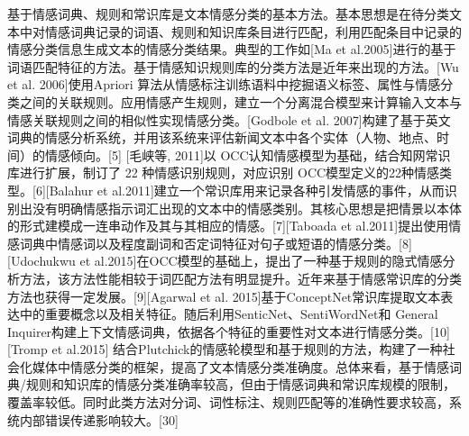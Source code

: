 基于情感词典、规则和常识库是文本情感分类的基本方法。基本思想是在待分类文本中对情感词典记录的词语、规则和知识库条目进行匹配，利用匹配条目中记录的情感分类信息生成文本的情感分类结果。典型的工作如[Ma et al.2005]进行的基于词语匹配特征的方法。基于情感知识规则库的分类方法是近年来出现的方法。[Wu et al. 2006]使用Apriori 算法从情感标注训练语料中挖掘语义标签、属性与情感分类之间的关联规则。应用情感产生规则，建立一个分离混合模型来计算输入文本与情感关联规则之间的相似性实现情感分类。[Godbole et al. 2007]构建了基于英文词典的情感分析系统，并用该系统来评估新闻文本中各个实体（人物、地点、时间）的情感倾向。[5] [毛峡等, 2011]以 OCC认知情感模型为基础，结合知网常识库进行扩展，制订了 22 种情感识别规则，对应识别 OCC模型定义的22种情感类型。[6][Balahur et al.2011]建立一个常识库用来记录各种引发情感的事件，从而识别出没有明确情感指示词汇出现的文本中的情感类别。其核心思想是把情景以本体的形式建模成一连串动作及其与其相应的情感。[7][Taboada et al.2011]提出使用情感词典中情感词以及程度副词和否定词特征对句子或短语的情感分类。[8][Udochukwu et al.2015]在OCC模型的基础上，提出了一种基于规则的隐式情感分析方法，该方法性能相较于词匹配方法有明显提升。近年来基于情感常识库的分类方法也获得一定发展。[9][Agarwal et al. 2015]基于ConceptNet常识库提取文本表达中的重要概念以及相关特征。随后利用SenticNet、SentiWordNet和 General Inquirer构建上下文情感词典，依据各个特征的重要性对文本进行情感分类。[10][Tromp et al.2015] 结合Plutchick的情感轮模型和基于规则的方法，构建了一种社会化媒体中情感分类的框架，提高了文本情感分类准确度。总体来看，基于情感词典/规则和知识库的情感分类准确率较高，但由于情感词典和常识库规模的限制，覆盖率较低。同时此类方法对分词、词性标注、规则匹配等的准确性要求较高，系统内部错误传递影响较大。[30]


